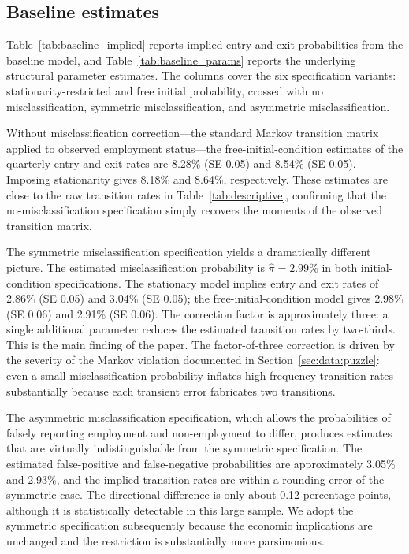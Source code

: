 
\subsection{Baseline estimates}\label{subsec:results:baseline}

Table~\ref{tab:baseline_implied} reports implied entry and exit probabilities
from the baseline model, and Table~\ref{tab:baseline_params} reports the
underlying structural parameter estimates. The columns cover the six
specification variants: stationarity-restricted and free initial probability,
crossed with no misclassification, symmetric misclassification, and asymmetric
misclassification.

Without misclassification correction---the standard Markov transition matrix
applied to observed employment status---the free-initial-condition estimates
of the quarterly entry and exit rates are 8.28\% (SE 0.05) and 8.54\%
(SE 0.05). Imposing stationarity gives 8.18\% and 8.64\%, respectively. These estimates are close to the raw
transition rates in Table~\ref{tab:descriptive}, confirming that the
no-misclassification specification simply recovers the moments of the observed
transition matrix.

The symmetric misclassification specification yields a dramatically different
picture. The estimated misclassification probability is $\hat{\pi} = 2.99\%$
in both initial-condition specifications. The stationary model implies entry
and exit rates of 2.86\% (SE 0.05) and 3.04\% (SE 0.05); the free-initial-condition
model gives 2.98\% (SE 0.06) and 2.91\% (SE 0.06).
The correction factor is approximately three: a single additional parameter
reduces the estimated transition rates by two-thirds. This is the main finding
of the paper. The factor-of-three correction is driven by the severity of the
Markov violation documented in Section~\ref{sec:data:puzzle}: even a small
misclassification probability inflates high-frequency transition rates
substantially because each transient error fabricates two transitions.

The asymmetric misclassification specification, which allows the probabilities
of falsely reporting employment and non-employment to differ, produces estimates
that are virtually indistinguishable from the symmetric specification. The
estimated false-positive and false-negative probabilities are approximately
3.05\% and 2.93\%, and the implied transition rates are within a rounding error
of the symmetric case. The directional difference is only about 0.12 percentage
points, although it is statistically detectable in this large sample. We adopt
the symmetric specification subsequently because the economic implications are
unchanged and the restriction is substantially more parsimonious.

